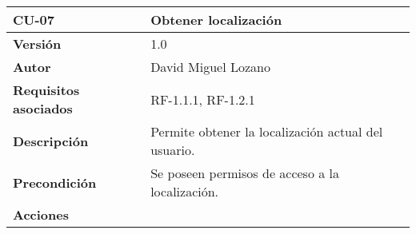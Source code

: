 \begin{longtable}[H]{@{}ll@{}}
\toprule
\begin{minipage}[b]{0.26\columnwidth}\raggedright\strut
\textbf{CU-07}\strut
\end{minipage} & \begin{minipage}[b]{0.68\columnwidth}\raggedright\strut
\textbf{Obtener localización}\strut
\end{minipage}\tabularnewline
\midrule
\endhead
\begin{minipage}[t]{0.26\columnwidth}\raggedright\strut
\textbf{Versión}\strut
\end{minipage} & \begin{minipage}[t]{0.68\columnwidth}\raggedright\strut
1.0\strut
\end{minipage}\tabularnewline
\begin{minipage}[t]{0.26\columnwidth}\raggedright\strut
\textbf{Autor}\strut
\end{minipage} & \begin{minipage}[t]{0.68\columnwidth}\raggedright\strut
David Miguel Lozano\strut
\end{minipage}\tabularnewline
\begin{minipage}[t]{0.26\columnwidth}\raggedright\strut
\textbf{Requisitos asociados}\strut
\end{minipage} & \begin{minipage}[t]{0.68\columnwidth}\raggedright\strut
RF-1.1.1, RF-1.2.1\strut
\end{minipage}\tabularnewline
\begin{minipage}[t]{0.26\columnwidth}\raggedright\strut
\textbf{Descripción}\strut
\end{minipage} & \begin{minipage}[t]{0.68\columnwidth}\raggedright\strut
Permite obtener la localización actual del usuario.\strut
\end{minipage}\tabularnewline
\begin{minipage}[t]{0.26\columnwidth}\raggedright\strut
\textbf{Precondición}\strut
\end{minipage} & \begin{minipage}[t]{0.68\columnwidth}\raggedright\strut
Se poseen permisos de acceso a la localización.\strut
\end{minipage}\tabularnewline
\begin{minipage}[t]{0.26\columnwidth}\raggedright\strut
\textbf{Acciones}\strut
\end{minipage} & \begin{minipage}[t]{0.68\columnwidth}\raggedright\strut

\end{minipage}
\end{longtable}

